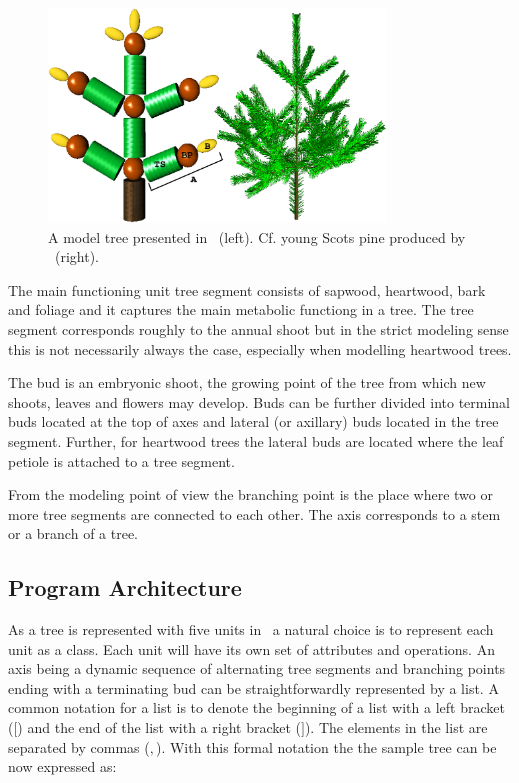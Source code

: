 \begin{figure}[h]
\begin{center}
\includegraphics[width=0.8\textwidth,height=0.5\textwidth]{Lignum3D.eps}
\caption{\label{fig:struct} A model tree presented in \lignum\
(left). Cf. young Scots pine produced by \lignum\ (right).}
\end{center}
\end{figure}

The main functioning unit tree segment consists of sapwood, heartwood,
bark and  foliage and it  captures the main  metabolic functiong  in a
tree.  The tree segment corresponds roughly to the annual shoot but in
the   strict modeling sense this is   not necessarily always the case,
especially when modelling heartwood trees.

The bud is  an  embryonic shoot, the  growing  point of the tree  from
which new shoots, leaves and flowers may develop.  Buds can be further
divided  into terminal buds located at  the top of  axes and lateral
(or   axillary) buds  located   in the  tree   segment.  Further,  for
heartwood trees the lateral buds are located where the leaf petiole is
attached to a tree segment.

From the modeling point of view the branching point is the place where
two or more  tree  segments are  connected  to each other.   The  axis
corresponds to a stem or a branch of a tree.

\subsection{Program Architecture}

As a tree is represented with  five units in \lignum\ a natural choice
is to represent each unit as a class.  Each unit will have its own set
of attributes  and operations.   An axis being  a dynamic  sequence of
alternating  tree   segments  and  branching  points   ending  with  a
terminating  bud can be  straightforwardly represented  by a  list.  A
common notation for a list is to denote the beginning of a list with a
left  bracket ($[$)  and the  end  of the  list with  a right  bracket
($]$). The elements  in the list are separated  by commas ($,$).  With
this formal notation the the sample tree can be now expressed as:

